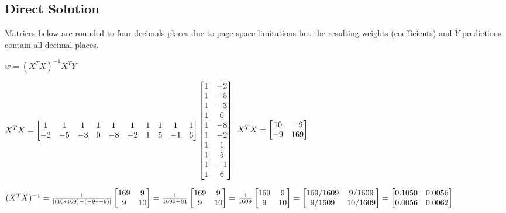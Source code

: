 \documentclass[12pt]{article}
\begin{document}
\newpage
\subsection{Direct Solution}
Matrices below are rounded to four decimals places due to page space limitations but the resulting weights (coefficients) and $\hat{Y}$ predictions contain all decimal places.

\hfill \break
\hfill \break

$w = (X^TX)^{-1}X^TY$

\noindent $X^TX = \begin{bmatrix}
	1 & 1 & 1 & 1 & 1 & 1 & 1 & 1 & 1 & 1\\
	-2 & -5 & -3 & 0 & -8 & -2 & 1 & 5 & -1 & 6
\end{bmatrix}
\begin{bmatrix}
	1 & -2\\
	1 & -5\\
	1 & -3\\
	1 & 0\\
	1 & -8\\
	1 & -2\\
	1 & 1\\
	1 & 5\\
	1 & -1\\
	1 & 6
\end{bmatrix}\\
$
$X^TX = 
\begin{bmatrix}
 10 & -9\\
-9 & 169\\
\end{bmatrix}\\
$

\hfill \break
\hfill \break

\noindent $(X^TX)^{-1} = 
\frac{1}{|(10*169)-(-9*-9)|}\begin{bmatrix}169 & 9\\ 9 & 10\end{bmatrix} = \frac{1}{1690-81}\begin{bmatrix}169 & 9\\ 9 & 10\end{bmatrix}=
\hfill \break
\frac{1}{1609}\begin{bmatrix}169 & 9\\ 9 & 10\end{bmatrix}=\begin{bmatrix}169/1609 & 9/1609\\ 9/1609 & 10/1609\end{bmatrix} = \begin{bmatrix}0.1050 & 0.0056\\ 0.0056 & 0.0062\end{bmatrix}\\
$
\end{document}
